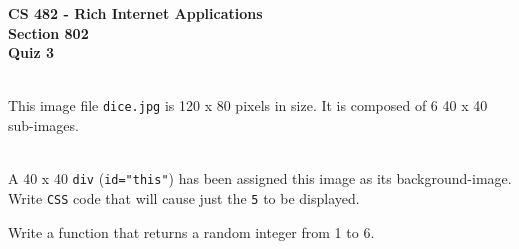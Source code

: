 \documentclass[letterpaper]{exam}
\begin{document}
\begin{center}
	\textbf{CS 482 - Rich Internet Applications} \\
	\textbf{Section 802} \\
	\textbf{Quiz 3} \\
	\vspace{5mm}
	 \\
\end{center}


\begin{questions}
	\question[5] This image file \texttt{dice.jpg} is 120 x 80 pixels in size. It is composed of 6 40 x 40 sub-images.
		\begin{figure}[ht!]
			\centering
		\end{figure}
	\\
		A 40 x 40 \texttt{div} (\texttt{id="this"}) has been assigned this image as its background-image. Write \texttt{CSS} code that will cause just the \texttt{5} to be displayed.
	
	\question[5] Write a function that returns a random integer from 1 to 6.
		
\end{questions}
\end{document}
